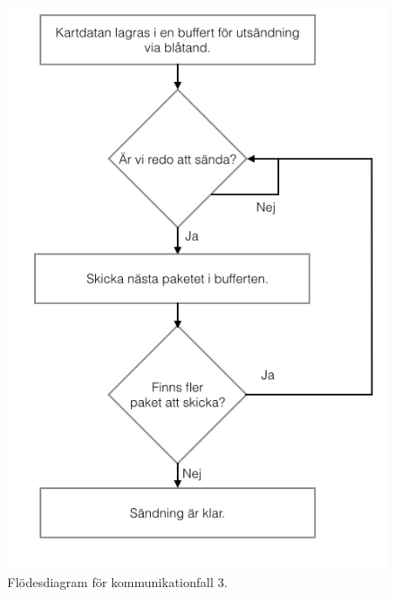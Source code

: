 \documentclass[a4paper,12pt,fleqn]{article}
\begin{document}
\begin{figure}[htp] %
  \begin{center}
  \includegraphics[keepaspectratio=true,width=0.9\linewidth]{bilder/SPIbild004.jpg}  %
  \end{center}
  \caption{Flödesdiagram för kommunikationfall 3.} %
  \label{fig:case3flow}
\end{figure}
\clearpage %
\newpage
\end{document}
